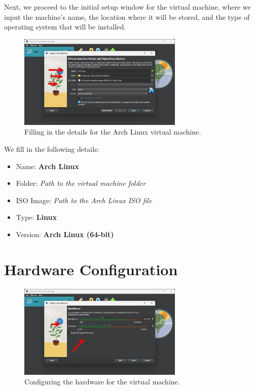 \documentclass{article}
\begin{document}
Next, we proceed to the initial setup window for the virtual machine, where we input the machine's name, the location where it will be stored, and the type of operating system that will be installed.

\begin{figure}[H]
    \centering
    \includegraphics[width=0.7\textwidth]{3.png}
    \caption{Filling in the details for the Arch Linux virtual machine.}
\end{figure}

We fill in the following details:
\begin{itemize}
    \item Name: \textbf{Arch Linux}
    \item Folder: \textit{Path to the virtual machine folder}
    \item ISO Image: \textit{Path to the Arch Linux ISO file}
    \item Type: \textbf{Linux}
    \item Version: \textbf{Arch Linux (64-bit)}
\end{itemize}

\section{Hardware Configuration}
\begin{figure}[H]
    \centering
    \includegraphics[width=0.7\textwidth]{4.png}
    \caption{Configuring the hardware for the virtual machine.}
\end{figure}
\end{document}
